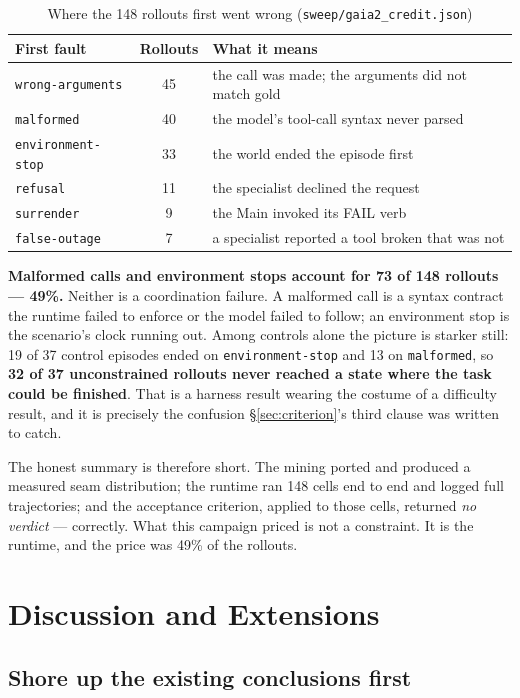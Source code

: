 \documentclass[11pt,a4paper]{article}
\begin{document}
\begin{table}[H]
\centering
\small
\caption{Where the 148 rollouts first went wrong (\texttt{sweep/gaia2\_credit.json})}
\label{tab:pivots}
\begin{tabularx}{\textwidth}{>{\raggedright\arraybackslash}p{3.4cm} c X}
\toprule
First fault & Rollouts & What it means\\
\midrule
\texttt{wrong-arguments} & 45 & the call was made; the arguments did not match gold\\
\texttt{malformed} & 40 & the model's tool-call syntax never parsed\\
\texttt{environment-stop} & 33 & the world ended the episode first\\
\texttt{refusal} & 11 & the specialist declined the request\\
\texttt{surrender} & 9 & the Main invoked its FAIL verb\\
\texttt{false-outage} & 7 & a specialist reported a tool broken that was not\\
\bottomrule
\end{tabularx}
\end{table}

\textbf{Malformed calls and environment stops account for 73 of 148 rollouts --- 49\%.} Neither is a coordination failure. A malformed call is a syntax contract the runtime failed to enforce or the model failed to follow; an environment stop is the scenario's clock running out. Among controls alone the picture is starker still: 19 of 37 control episodes ended on \texttt{environment-stop} and 13 on \texttt{malformed}, so \textbf{32 of 37 unconstrained rollouts never reached a state where the task could be finished}. That is a harness result wearing the costume of a difficulty result, and it is precisely the confusion \S\ref{sec:criterion}'s third clause was written to catch.

The honest summary is therefore short. The mining ported and produced a measured seam distribution; the runtime ran 148 cells end to end and logged full trajectories; and the acceptance criterion, applied to those cells, returned \emph{no verdict} --- correctly. What this campaign priced is not a constraint. It is the runtime, and the price was 49\% of the rollouts.

\section{Discussion and Extensions}

\subsection{Shore up the existing conclusions first}
\label{sec:verifyfirst}
\label{sec:next}
\end{document}
